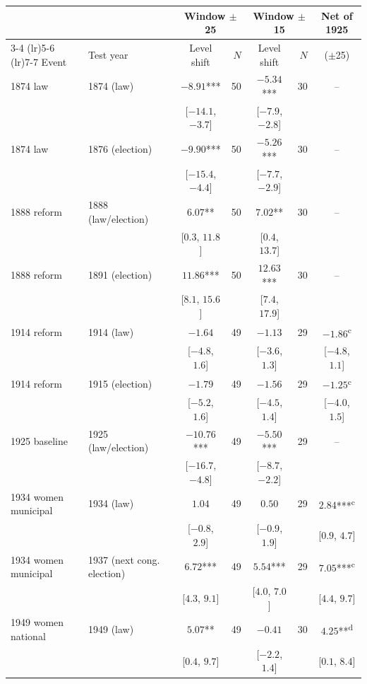 \begin{tabular}{llcrcrc}
\toprule
 & & \multicolumn{2}{c}{Window $\pm$25} & \multicolumn{2}{c}{Window $\pm$15} & Net of 1925 \\
\cmidrule(lr){3-4} \cmidrule(lr){5-6} \cmidrule(lr){7-7}
Event & Test year & Level shift & $N$ & Level shift & $N$ & ($\pm$25) \\
\midrule
1874 law & 1874 (law) & $-8.91$*** & 50 & $-5.34$*** & 30 & -- \\
 & & [$-14.1$, $-3.7$] & & [$-7.9$, $-2.8$] & &  \\
1874 law & 1876 (election) & $-9.90$*** & 50 & $-5.26$*** & 30 & -- \\
 & & [$-15.4$, $-4.4$] & & [$-7.7$, $-2.9$] & &  \\
1888 reform & 1888 (law/election) & $6.07$** & 50 & $7.02$** & 30 & -- \\
 & & [$0.3$, $11.8$] & & [$0.4$, $13.7$] & &  \\
1888 reform & 1891 (election) & $11.86$*** & 50 & $12.63$*** & 30 & -- \\
 & & [$8.1$, $15.6$] & & [$7.4$, $17.9$] & &  \\
1914 reform & 1914 (law) & $-1.64$ & 49 & $-1.13$ & 29 & $-1.86$\textsuperscript{c} \\
 & & [$-4.8$, $1.6$] & & [$-3.6$, $1.3$] & & [$-4.8$, $1.1$] \\
1914 reform & 1915 (election) & $-1.79$ & 49 & $-1.56$ & 29 & $-1.25$\textsuperscript{c} \\
 & & [$-5.2$, $1.6$] & & [$-4.5$, $1.4$] & & [$-4.0$, $1.5$] \\
1925 baseline & 1925 (law/election) & $-10.76$*** & 49 & $-5.50$*** & 29 & -- \\
 & & [$-16.7$, $-4.8$] & & [$-8.7$, $-2.2$] & &  \\
1934 women municipal & 1934 (law) & $1.04$ & 49 & $0.50$ & 29 & $2.84$***\textsuperscript{c} \\
 & & [$-0.8$, $2.9$] & & [$-0.9$, $1.9$] & & [$0.9$, $4.7$] \\
1934 women municipal & 1937 (next cong. election) & $6.72$*** & 49 & $5.54$*** & 29 & $7.05$***\textsuperscript{c} \\
 & & [$4.3$, $9.1$] & & [$4.0$, $7.0$] & & [$4.4$, $9.7$] \\
1949 women national & 1949 (law) & $5.07$** & 49 & $-0.41$ & 30 & $4.25$**\textsuperscript{d} \\
 & & [$0.4$, $9.7$] & & [$-2.2$, $1.4$] & & [$0.1$, $8.4$] \\

\end{tabular}
